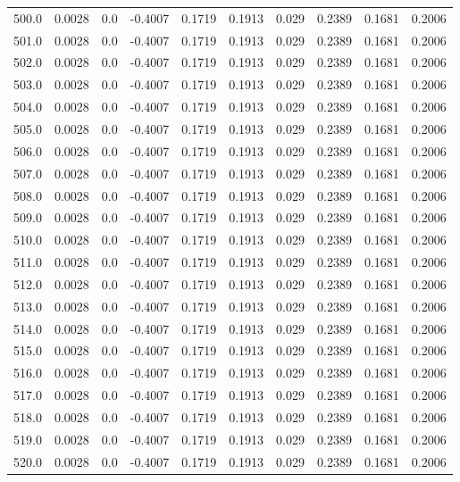 \begin{longtable}{lrrrrrrrrr}
500.0 & 0.0028 & 0.0 & -0.4007 & 0.1719 & 0.1913 & 0.029 & 0.2389 & 0.1681 & 0.2006 \\
501.0 & 0.0028 & 0.0 & -0.4007 & 0.1719 & 0.1913 & 0.029 & 0.2389 & 0.1681 & 0.2006 \\
502.0 & 0.0028 & 0.0 & -0.4007 & 0.1719 & 0.1913 & 0.029 & 0.2389 & 0.1681 & 0.2006 \\
503.0 & 0.0028 & 0.0 & -0.4007 & 0.1719 & 0.1913 & 0.029 & 0.2389 & 0.1681 & 0.2006 \\
504.0 & 0.0028 & 0.0 & -0.4007 & 0.1719 & 0.1913 & 0.029 & 0.2389 & 0.1681 & 0.2006 \\
505.0 & 0.0028 & 0.0 & -0.4007 & 0.1719 & 0.1913 & 0.029 & 0.2389 & 0.1681 & 0.2006 \\
506.0 & 0.0028 & 0.0 & -0.4007 & 0.1719 & 0.1913 & 0.029 & 0.2389 & 0.1681 & 0.2006 \\
507.0 & 0.0028 & 0.0 & -0.4007 & 0.1719 & 0.1913 & 0.029 & 0.2389 & 0.1681 & 0.2006 \\
508.0 & 0.0028 & 0.0 & -0.4007 & 0.1719 & 0.1913 & 0.029 & 0.2389 & 0.1681 & 0.2006 \\
509.0 & 0.0028 & 0.0 & -0.4007 & 0.1719 & 0.1913 & 0.029 & 0.2389 & 0.1681 & 0.2006 \\
510.0 & 0.0028 & 0.0 & -0.4007 & 0.1719 & 0.1913 & 0.029 & 0.2389 & 0.1681 & 0.2006 \\
511.0 & 0.0028 & 0.0 & -0.4007 & 0.1719 & 0.1913 & 0.029 & 0.2389 & 0.1681 & 0.2006 \\
512.0 & 0.0028 & 0.0 & -0.4007 & 0.1719 & 0.1913 & 0.029 & 0.2389 & 0.1681 & 0.2006 \\
513.0 & 0.0028 & 0.0 & -0.4007 & 0.1719 & 0.1913 & 0.029 & 0.2389 & 0.1681 & 0.2006 \\
514.0 & 0.0028 & 0.0 & -0.4007 & 0.1719 & 0.1913 & 0.029 & 0.2389 & 0.1681 & 0.2006 \\
515.0 & 0.0028 & 0.0 & -0.4007 & 0.1719 & 0.1913 & 0.029 & 0.2389 & 0.1681 & 0.2006 \\
516.0 & 0.0028 & 0.0 & -0.4007 & 0.1719 & 0.1913 & 0.029 & 0.2389 & 0.1681 & 0.2006 \\
517.0 & 0.0028 & 0.0 & -0.4007 & 0.1719 & 0.1913 & 0.029 & 0.2389 & 0.1681 & 0.2006 \\
518.0 & 0.0028 & 0.0 & -0.4007 & 0.1719 & 0.1913 & 0.029 & 0.2389 & 0.1681 & 0.2006 \\
519.0 & 0.0028 & 0.0 & -0.4007 & 0.1719 & 0.1913 & 0.029 & 0.2389 & 0.1681 & 0.2006 \\
520.0 & 0.0028 & 0.0 & -0.4007 & 0.1719 & 0.1913 & 0.029 & 0.2389 & 0.1681 & 0.2006 \\

\end{longtable}
